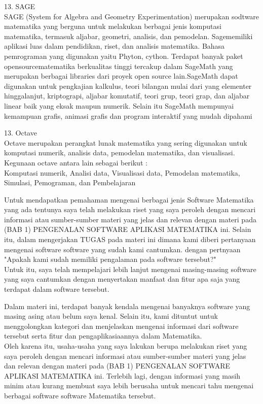 \documentclass[a4paper,10pt]{article}
\begin{document}
\begin{eulernotebook}
\begin{eulercomment}
13. SAGE\\
SAGE (System for Algebra and Geometry Experimentation) merupakan
sodtware matematika yang berguna untuk melakukan berbagai jenis
komputasi matematika, termasuk aljabar, geometri, analisis, dan
pemodelan. Sagememiliki aplikasi luas dalam pendidikan, riset, dan
analisis matematika. Bahasa pemrograman yang digunakan yaitu Phyton,
cython. Terdapat banyak paket opensourcematematika berkualitas tinggi
tercakup dalam SageMath yang merupakan berbagai libraries dari proyek
open source lain.SageMath dapat digunakan untuk pengkajian kalkulus,
teori bilangan mulai dari yang elementer hinggalanjut, kriptograpi,
aljabar komutatif, teori grup, teori grap, dan aljabar linear baik
yang eksak maupun numerik. Selain itu SageMath mempunyai kemampuan
grafis, animasi grafis dan program interaktif yang mudah dipahami

13. Octave\\
Octave merupakan perangkat lunak matematika yang sering digunakan
untuk komputasi numerik, analisis data, pemodelan matematika, dan
visualisasi. Kegunaan octave antara lain sebagai berikut :\\
Komputasi numerik, Analisi data, Visualisasi data, Pemodelan
matematika, Simulasi, Pemograman, dan Pembelajaran

\end{eulercomment}
\begin{eulercomment}
Untuk mendapatkan pemahaman mengenai berbagai jenis Software
Matematika yang ada tentunya saya telah melakukan riset yang saya
peroleh dengan mencari informasi atau sumber-sumber materi yang jelas
dan relevan dengan materi pada (BAB 1) PENGENALAN SOFTWARE APLIKASI
MATEMATIKA ini. Selain itu, dalam mengerjakan TUGAS pada materi ini
dimana kami diberi pertanyaan mengenai software software yang sudah
kami cantumkan. dengan pertnyaan "Apakah kami sudah memiliki
pengalaman pada software tersebut?"\\
Untuk itu, saya telah mempelajari lebih lanjut mengenai masing-masing
software yang saya cantumkan dengan menyertakan manfaat dan fitur apa
saja yang terdapat dalam software tersebut.

\end{eulercomment}
\begin{eulercomment}
Dalam materi ini, terdapat banyak kendala mengenai banyaknya software
yang masing asing atau belum saya kenal. Selain itu, kami dituntut
untuk menggolongkan kategori dan menjelaskan mengenai informasi dari
software tersebut serta fitur dan pengaplikasiaannya dalam Matematika.\\
Oleh karena itu, usaha-usaha yang saya lakukan berupa melakukan riset
yang saya peroleh dengan mencari informasi atau sumber-sumber materi
yang jelas dan relevan dengan materi pada (BAB 1) PENGENALAN SOFTWARE
APLIKASI MATEMATIKA ini. Terlebih lagi, dengan informasi yang masih
minim atau kurang membuat saya lebih berusaha untuk mencari tahu
mengenai berbagai software software Matematika tersebut.



\end{eulercomment}
\end{eulernotebook}
\end{document}
